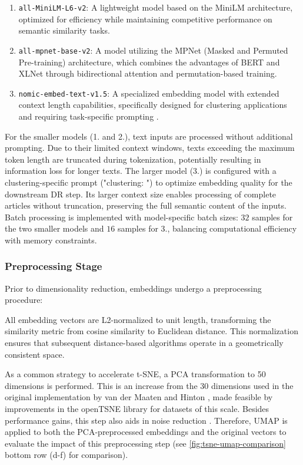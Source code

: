 \begin{enumerate}
    \item \texttt{all-MiniLM-L6-v2}: A lightweight model based on the MiniLM architecture, optimized for efficiency while maintaining competitive performance on semantic similarity tasks.
    \item \texttt{all-mpnet-base-v2}: A model utilizing the MPNet (Masked and Permuted Pre-training) architecture, which combines the advantages of BERT and XLNet through bidirectional attention and permutation-based training.
    \item \texttt{nomic-embed-text-v1.5}: A specialized embedding model with extended context length capabilities, specifically designed for clustering applications and requiring task-specific prompting \cite{nussbaumNomicEmbedTraining2025}.
\end{enumerate}

For the smaller models (1. and 2.), text inputs are processed without additional prompting. Due to their limited context windows, texts exceeding the maximum token length are truncated during tokenization, potentially resulting in information loss for longer texts. The larger model (3.) is configured with a clustering-specific prompt ("clustering: ") to optimize embedding quality for the downstream DR step. Its larger context size enables processing of complete articles without truncation, preserving the full semantic content of the inputs. Batch processing is implemented with model-specific batch sizes: $32$ samples for the two smaller models and $16$ samples for 3., balancing computational efficiency with memory constraints.

\subsubsection{Preprocessing Stage}
\label{sec:preprocessing}

Prior to dimensionality reduction, embeddings undergo a preprocessing procedure:

All embedding vectors are L2-normalized to unit length, transforming the similarity metric from cosine similarity to Euclidean distance. This normalization ensures that subsequent distance-based algorithms operate in a geometrically consistent space.

As a common strategy to accelerate t-SNE, a PCA transformation to 50 dimensions is performed. This is an increase from the 30 dimensions used in the original implementation by van der Maaten and Hinton \cite{JMLR:v9:vandermaaten08a}, made feasible by improvements in the openTSNE library \cite{policarOpenTSNEModularPython2024} for datasets of this scale. Besides performance gains, this step also aids in noise reduction \cite{JMLR:v9:vandermaaten08a}. Therefore, UMAP is applied to both the PCA-preprocessed embeddings and the original vectors to evaluate the impact of this preprocessing step (see \autoref{fig:tsne-umap-comparison} bottom row (d-f) for comparison).

